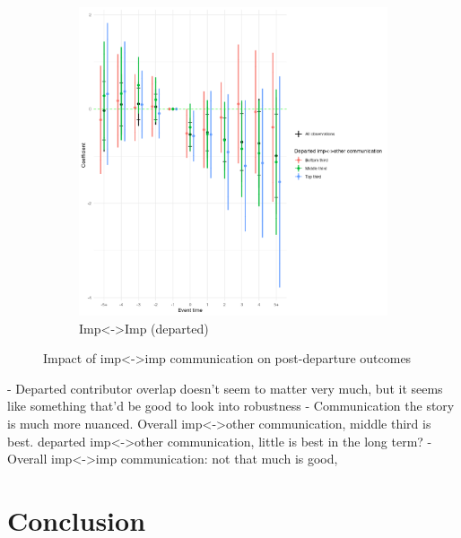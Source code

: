 \documentclass[12pt,notitlepage]{article}
\begin{document}
\begin{itemize}
\begin{figure}[hp]
\begin{subfigure}[b]{0.48\textwidth}
    \includegraphics[width=\textwidth]{temp/imp_other_dept_combined_2p_back_bin_third.png}
    \caption{Imp<->Imp (departed)}
  \end{subfigure}
  \caption{Impact of imp<->imp communication on post-departure outcomes}
\end{figure}

\end{itemize}




- Departed contributor overlap doesn't seem to matter very much, but it seems like something that'd be good to look into robustness
- Communication the story is much more nuanced. Overall imp<->other communication, middle third is best. departed imp<->other communication, little is best in the long term?
- Overall imp<->imp communication: not that much is good, 




\section{Conclusion} \label{sec:conclusion}



\singlespacing


\clearpage

\onehalfspacing
\end{document}
